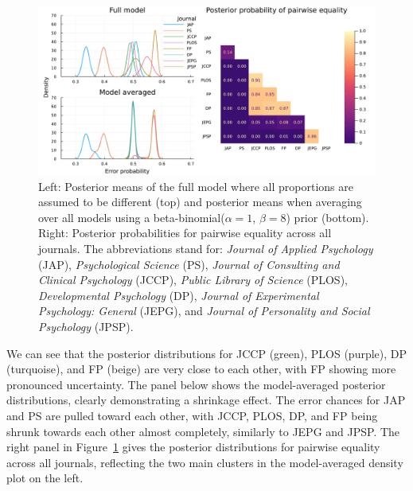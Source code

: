 \documentclass[11pt,a4paper]{article}
\theoremstyle{definition} %
\theoremstyle{case}
\newcommand{\FD}[1]{\textcolor{red}{Fabian: #1 }}
\begin{document}
\begin{figure}
    \centering
    \includegraphics[width=\textwidth]{application_proportions_2panel_plot.pdf}
    \caption{Left: Posterior means of the full model where all proportions are assumed to be different (top) and posterior means when averaging over all models using a beta-binomial($\alpha = 1$, $\beta = 8$) prior (bottom). Right: Posterior probabilities for pairwise equality across all journals. The abbreviations stand for:
    \emph{Journal of Applied Psychology} (JAP), \emph{Psychological Science} (PS), \emph{Journal of Consulting and Clinical Psychology} (JCCP), \emph{ Public Library of Science} (PLOS), \emph{Developmental Psychology} (DP), \emph{Journal of Experimental Psychology: General} (JEPG), and \emph{Journal of Personality and Social Psychology} (JPSP).}
    \label{fig:demo_proportions}
\end{figure}

We can see that the posterior distributions for JCCP (green), PLOS (purple), DP (turquoise), and FP (beige) are very close to each other, with FP showing more pronounced uncertainty. The panel below shows the model-averaged posterior distributions, clearly demonstrating a shrinkage effect. The error chances for JAP and PS are pulled toward each other, with JCCP, PLOS, DP, and FP being shrunk towards each other almost completely, similarly to JEPG and JPSP. The right panel in Figure~\ref{fig:demo_proportions} gives the posterior distributions for pairwise equality across all journals, reflecting the two main clusters in the model-averaged density plot on the left.

\end{document}
